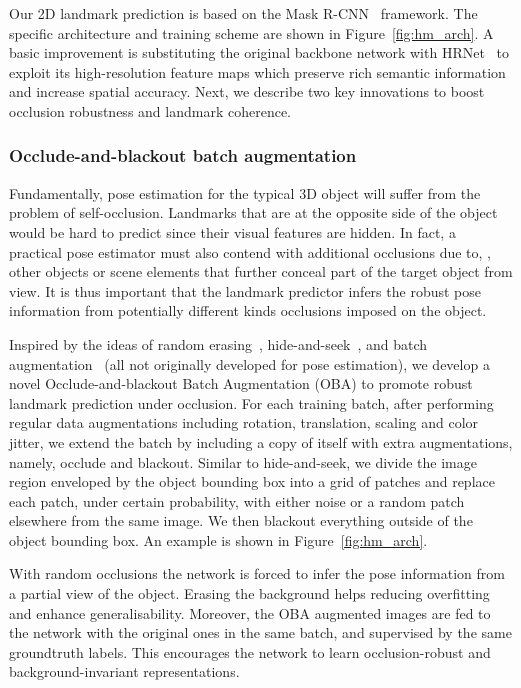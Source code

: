 \documentclass[10pt,twocolumn,letterpaper]{article}
\begin{document}
Our 2D landmark prediction is based on the Mask R-CNN~\cite{He2018mask} framework. The specific architecture and training scheme are shown in Figure~\ref{fig:hm_arch}. A basic improvement is substituting the original backbone network with HRNet~\cite{Sun2019deep, Wang2020deep} to exploit its high-resolution feature maps which preserve rich semantic information and increase spatial accuracy. Next, we describe two key innovations to boost occlusion robustness and landmark coherence.

\subsubsection{Occlude-and-blackout batch augmentation}

Fundamentally, pose estimation for the typical 3D object will suffer from the problem of self-occlusion. Landmarks that are at the opposite side of the object would be hard to predict since their visual features are hidden. In fact, a practical pose estimator must also contend with additional occlusions due to, \eg, other objects or scene elements that further conceal part of the target object from view. It is thus important that the landmark predictor infers the robust pose information from potentially different kinds occlusions imposed on the object.



Inspired by the ideas of random erasing~\cite{Zhong2020random}, hide-and-seek~\cite{Singh2017hide}, and batch augmentation~\cite{Hoffer2020augment} (all not originally developed for pose estimation), we develop a novel Occlude-and-blackout Batch Augmentation (OBA) to promote robust landmark prediction under occlusion. For each training batch, after performing regular data augmentations including rotation, translation, scaling and color jitter, we extend the batch by including a copy of itself with extra augmentations, namely, occlude and blackout. Similar to hide-and-seek, we divide the image region enveloped by the object bounding box into a grid of patches and replace each patch, under certain probability, with either noise or a random patch elsewhere from the same image. We then blackout everything outside of the object bounding box. An example is shown in Figure~\ref{fig:hm_arch}. 


With random occlusions the network is forced to infer the pose information from a partial view of the object. Erasing the background helps reducing overfitting and enhance generalisability. Moreover, the OBA augmented images are fed to the network with the original ones in the same batch, and supervised by the same groundtruth labels. This encourages the network to learn occlusion-robust and background-invariant representations.
\end{document}
